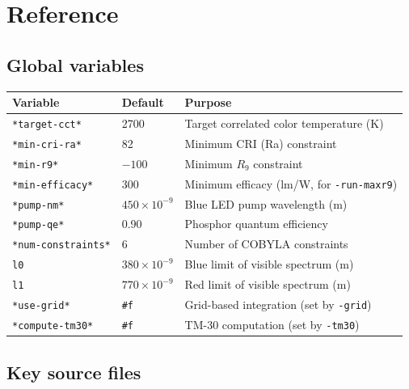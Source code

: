 \documentclass[11pt]{article}
\newcommand{\cmd}[1]{\texttt{#1}}
\begin{document}
\section{Reference}
\label{sec:reference}

\subsection{Global variables}

\begin{center}
\begin{tabular}{@{}lll@{}}
\toprule
Variable & Default & Purpose \\
\midrule
\cmd{*target-cct*}      & 2700  & Target correlated color temperature (K) \\
\cmd{*min-cri-ra*}      & 82    & Minimum CRI (Ra) constraint \\
\cmd{*min-r9*}          & $-100$ & Minimum $R_9$ constraint \\
\cmd{*min-efficacy*}    & 300   & Minimum efficacy (lm/W, for \cmd{-run-maxr9}) \\
\cmd{*pump-nm*}         & $450 \times 10^{-9}$ & Blue LED pump wavelength (m) \\
\cmd{*pump-qe*}         & 0.90  & Phosphor quantum efficiency \\
\cmd{*num-constraints*} & 6     & Number of COBYLA constraints \\
\cmd{l0}                & $380 \times 10^{-9}$ & Blue limit of visible spectrum (m) \\
\cmd{l1}                & $770 \times 10^{-9}$ & Red limit of visible spectrum (m) \\
\cmd{*use-grid*}        & \cmd{\#f} & Grid-based integration (set by \cmd{-grid}) \\
\cmd{*compute-tm30*}    & \cmd{\#f} & TM-30 computation (set by \cmd{-tm30}) \\
\bottomrule
\end{tabular}
\end{center}

\subsection{Key source files}
\end{document}
